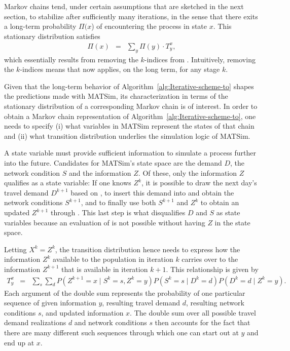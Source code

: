 Markov chains tend, under certain assumptions that are sketched in
the next section, to stabilize after sufficiently many iterations,
in the sense that there exits a long-term probability $\Pi(x$) of
encountering the process in state $x$. This stationary distribution
satisfies
\begin{eqnarray}
\Pi(x) & = & \sum_{y}\Pi(y)\cdot T_{y}^{x},\label{eq:mc-stationary}
\end{eqnarray}
which essentially results from removing the $k$-indices from .
Intuitively, removing the $k$-indices means that 
now applies, on the long term, for any stage $k$.

Given that the long-term behavior of Algorithm~\ref{alg:Iterative-scheme-to}
shapes the predictions made with MATSim, its characterization in terms
of the stationary distribution of a corresponding Markov chain is
of interest. In order to obtain a Markov chain representation of Algorithm~\ref{alg:Iterative-scheme-to},
one needs to specify (i) what variables in MATSim represent the states
of that chain and (ii) what transition distribution underlies the
simulation logic of MATSim.

A state variable must provide sufficient information to simulate a
process further into the future. Candidates for MATSim's state space
are the demand $D$, the network condition $S$ and the information
$Z$. Of these, only the information $Z$ qualifies as a state variable:
If one knows $Z^{k}$, it is possible to draw the next day's travel
demand $D^{k+1}$ based on , to insert this
demand into  and obtain the network
conditions $S^{k+1}$, and to finally use both $S^{k+1}$ and $Z^{k}$
to obtain an updated $Z^{k+1}$ through .
This last step is what disqualifies $D$ and $S$ as state variables
because an evaluation of  is not possible
without having $Z$ in the state space.

Letting $X^{k}=Z^{k}$, the transition distribution hence needs to
express how the information $Z^{k}$ available to the population in
iteration $k$ carries over to the information $Z^{k+1}$ that is
available in iteration $k+1$. This relationship is given by
\begin{eqnarray}
T_{y}^{x} & = & \sum_{s}\sum_{d}P(Z^{k+1}=x\mid S^{k}=s,Z^{k}=y)P(S^{k}=s\mid D^{k}=d)P(D^{k}=d\mid Z^{k}=y).\label{eq:matsim-transition-distr}
\end{eqnarray}
Each argument of the double sum represents the probability of one
particular sequence of given information $y$, resulting travel demand
$d$, resulting network conditions $s$, and updated information $x$.
The double sum over all possible travel demand realizations $d$ and
network conditions $s$ then accounts for the fact that there are
many different such sequences through which one can start out at $y$
and end up at $x$.


